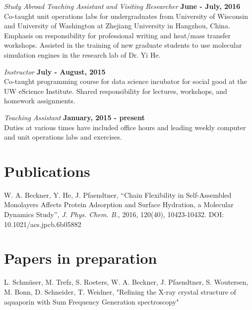\documentclass[margin,line]{res}
\begin{document}
\begin{resume}

{\em Study Abroad Teaching Assistant and Visiting Researcher} \hfill {\bf June - July, 2016}\\
Co-taught unit operations labs for undergraduates from University of
Wisconsin and University of Washington at 
Zhejiang University in Hangzhou, China. Emphasis on responsibility for
professional writing and heat/mass transfer workshops. 
Assisted in the training of new graduate students to use molecular
simulation engines in the research lab of Dr. Yi He. 
\vspace*{.05in}  

{\em Instructor} \hfill {\bf July - August, 2015}\\
Co-taught programming course for data science incubator for social good
at the UW eScience Institute. Shared responsibility for lectures, workshops,
and homework assignments.  
\vspace*{.05in}  

{\em Teaching Assistant} \hfill {\bf January, 2015  - present}\\
Duties at various times have included 
office hours and leading weekly computer and unit operations labs and exercises.


\section{\sc Publications}

W. A. Beckner, Y. He, J. Pfaendtner, “Chain Flexibility in Self-Assembled Monolayers Affects Protein Adsorption and Surface Hydration, a Molecular Dynamics Study”, {\it J. Phys. Chem. B.}, 2016, 120(40), 10423-10432. DOI: 10.1021/acs.jpcb.6b05882

\section{\sc Papers in preparation}

L. Schmüser, M. Trefz, S. Roeters, W. A. Beckner, J. Pfaendtner, S. Woutersen, M. Bonn, D. Schneider, T. Weidner, "Refining the X-ray crystal structure of aquaporin with Sum Frequency Generation spectroscopy"


\end{resume}
\end{document}
